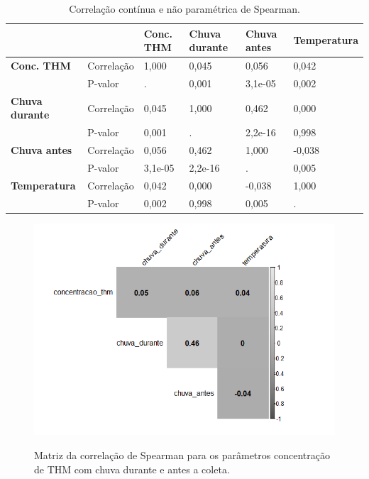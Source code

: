 \begin{table}[!htb]
\centering
\small
\caption {Correlação contínua e não paramétrica de Spearman.}
\label{tab:com_esp}
    \begin{tabular}{p{2.5cm}p{}p{2cm}p{2.5cm}p{2.1cm}p{2cm}}
    \toprule
      & & \textbf{Conc. THM}&\textbf{Chuva durante}& \textbf{Chuva antes} & \textbf{Temperatura}\\ \hline
     \textbf{Conc. THM} & Correlação & 1,000 & 0,045 & 0,056 & 0,042 \\
      & P-valor & . & 0,001 & 3,1e-05 & 0,002\\\hline
     \textbf{Chuva durante} & Correlação & 0,045 & 1,000 & 0,462 & 0,000\\
      & P-valor & 0,001 & . & 2,2e-16 & 0,998\\\hline
      \textbf{Chuva antes} & Correlação  & 0,056 & 0,462 & 1,000 & -0,038\\
     & P-valor & 3,1e-05 & 2,2e-16 & . & 0,005\\\hline
     \textbf{Temperatura} &  Correlação & 0,042 & 0,000 & -0,038& 1,000\\
     & P-valor & 0,002 & 0,998 & 0,005 & .\\
     \bottomrule
    \end{tabular}
    \label{tab01}
    
\end{table}



\begin{figure}[!htb]
\caption{\small Matriz da correlação de Spearman para os parâmetros concentração de THM com chuva durante e antes a coleta.}
\centering
\includegraphics[scale=0.8]{imagens/Rplot.png}
\label{fig02}
\end{figure}


